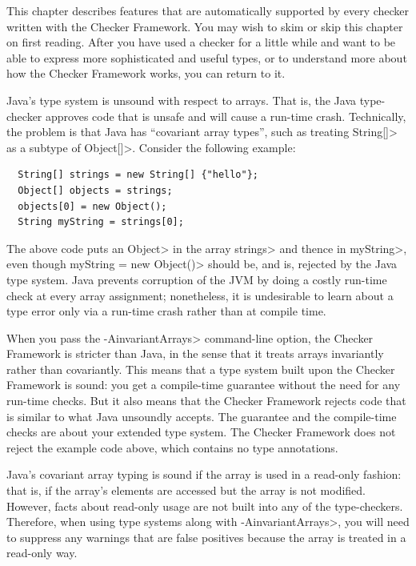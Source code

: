 
This chapter describes features that are automatically supported by every
checker written with the Checker Framework.
You may wish to skim or skip this chapter on first reading.  After you have
used a checker for a little while and want to be able to express more
sophisticated and useful types, or to understand more about how the Checker
Framework works, you can return to it.



Java's type system is unsound with respect to arrays.  That is, the Java
type-checker approves code that is unsafe and will cause a run-time crash.
Technically, the problem is that Java has ``covariant array types'', such
as treating \<String[]> as a subtype of \<Object[]>.  Consider the
following example:

\begin{Verbatim}
  String[] strings = new String[] {"hello"};
  Object[] objects = strings;
  objects[0] = new Object();
  String myString = strings[0];
\end{Verbatim}

\noindent
The above code puts an \<Object> in the array \<strings> and thence in
\<myString>, even though \<myString = new Object()> should be, and is,
rejected by the Java type system.  Java prevents corruption of the JVM by
doing a costly run-time check at every array assignment; nonetheless, it is
undesirable to learn about a type error only via a run-time crash rather
than at compile time.

When you pass the \<-AinvariantArrays> command-line option,
the Checker Framework is stricter than Java, in the sense that it treats
arrays invariantly rather than covariantly.  This means that a type system
built upon the Checker Framework is sound:  you get a compile-time
guarantee without the need for any run-time checks.  But it also means that
the Checker Framework rejects code that is similar to what Java unsoundly
accepts.  The guarantee and the compile-time checks are about your
extended type system.  The Checker Framework does not reject the example
code above, which contains no type annotations.

Java's covariant array typing is sound if the array is used in a read-only
fashion:  that is, if the array's elements are accessed but the array is
not modified.  However, facts about read-only usage are not built into any of
the type-checkers.  Therefore, when using type systems
along with \<-AinvariantArrays>, you will need to suppress any warnings that
are false positives because the array is treated in a read-only way.


